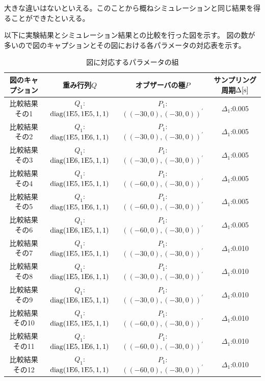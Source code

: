 	大きな違いはないといえる。このことから概ねシミュレーションと同じ結果を得ることができたといえる。
	\par
	以下に実験結果とシミュレーション結果との比較を行った図を示す。
	図の数が多いので図のキャプションとその図における各パラメータの対応表を示す。
	\begin{table}[htb]
		\begin{center}
			\caption{図に対応するパラメータの組}
			\medskip
			
			\begin{tabular}{|c|c|c|c|}\hline
				図のキャプション & 重み行列$Q$ & オブザーバの極$P$ & サンプリング周期$\Delta[\rm{s}]$ \\ \hline\hline
				比較結果その1 & $Q_1$:$\rm{diag}(1E5,1E5,1,1)$ & $P_1$:$((-30,0),(-30,0))^{'}$ & $\Delta_1$:0.005 \\ \hline
				比較結果その2 & $Q_1$:$\rm{diag}(1E5,1E6,1,1)$ & $P_1$:$((-30,0),(-30,0))^{'}$ & $\Delta_1$:0.005 \\ \hline
				比較結果その3 & $Q_1$:$\rm{diag}(1E6,1E5,1,1)$ & $P_1$:$((-30,0),(-30,0))^{'}$ & $\Delta_1$:0.005 \\ \hline
				比較結果その4 & $Q_1$:$\rm{diag}(1E5,1E5,1,1)$ & $P_1$:$((-60,0),(-30,0))^{'}$ & $\Delta_1$:0.005 \\ \hline
				比較結果その5 & $Q_1$:$\rm{diag}(1E5,1E6,1,1)$ & $P_1$:$((-60,0),(-30,0))^{'}$ & $\Delta_1$:0.005 \\ \hline
				比較結果その6 & $Q_1$:$\rm{diag}(1E6,1E5,1,1)$ & $P_1$:$((-60,0),(-30,0))^{'}$ & $\Delta_1$:0.005 \\ \hline
				比較結果その7 & $Q_1$:$\rm{diag}(1E5,1E5,1,1)$ & $P_1$:$((-30,0),(-30,0))^{'}$ & $\Delta_1$:0.010 \\ \hline
				比較結果その8 & $Q_1$:$\rm{diag}(1E5,1E6,1,1)$ & $P_1$:$((-30,0),(-30,0))^{'}$ & $\Delta_1$:0.010 \\ \hline
				比較結果その9 & $Q_1$:$\rm{diag}(1E6,1E5,1,1)$ & $P_1$:$((-30,0),(-30,0))^{'}$ & $\Delta_1$:0.010 \\ \hline
				比較結果その10 & $Q_1$:$\rm{diag}(1E5,1E5,1,1)$ & $P_1$:$((-60,0),(-30,0))^{'}$ & $\Delta_1$:0.010 \\ \hline
				比較結果その11 & $Q_1$:$\rm{diag}(1E5,1E6,1,1)$ & $P_1$:$((-60,0),(-30,0))^{'}$ & $\Delta_1$:0.010 \\ \hline
				比較結果その12 & $Q_1$:$\rm{diag}(1E6,1E5,1,1)$ & $P_1$:$((-60,0),(-30,0))^{'}$ & $\Delta_1$:0.010 \\ \hline
			\end{tabular}
		\end{center}
		\label{table:huriage_control}
	\end{table}
	
